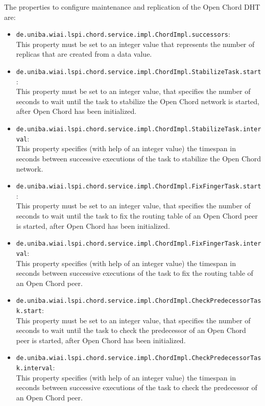 The properties to configure maintenance and replication of the Open Chord DHT are: 
\begin{itemize}
\item {\tt de.uniba.wiai.lspi.chord.service.impl.ChordImpl.successors}:\\  This property 
must be set to an integer value that represents the number of replicas that are created 
from a data value. 
\item {\tt de.uniba.wiai.lspi.chord.service.impl.ChordImpl.StabilizeTask.start}:\\  This 
property must be set to an integer value, that specifies the number of seconds to wait 
until the task to stabilize the Open Chord network is started, after Open Chord has 
been initialized. 
\item {\tt de.uniba.wiai.lspi.chord.service.impl.ChordImpl.StabilizeTask.interval}:\\  This property specifies (with help of an integer value) the timespan in seconds between 
successive executions of the task to stabilize the Open Chord network. 
\item {\tt de.uniba.wiai.lspi.chord.service.impl.ChordImpl.FixFingerTask.start}:\\  This 
property must be set to an integer value, that specifies the number of seconds to wait 
until the task to fix the routing table of an Open Chord peer is started, after Open Chord has been initialized. 
\item {\tt de.uniba.wiai.lspi.chord.service.impl.ChordImpl.FixFingerTask.interval}:\\  
This property specifies (with help of an integer value) the timespan in seconds between 
successive executions of the task to fix the routing table of an Open Chord peer. 
\item {\tt de.uniba.wiai.lspi.chord.service.impl.ChordImpl.CheckPredecessorTask.start}:\\  
This property must be set to an integer value, that specifies the number of seconds to wait until the task to check the predecessor of an Open Chord peer is started, after Open Chord has been initialized. 
\item {\tt de.uniba.wiai.lspi.chord.service.impl.ChordImpl.CheckPredecessorTask.interval}:\\ 
This property specifies (with help of an integer value) the timespan in seconds between 
successive executions of the task to check the predecessor of an Open Chord peer.
\end{itemize}

